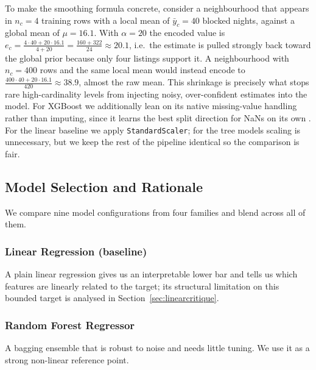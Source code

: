 \documentclass[journal]{IEEEtran}
\begin{document}
To make the smoothing formula concrete, consider a neighbourhood that appears in
$n_c=4$ training rows with a local mean of $\bar y_c=40$ blocked nights, against a
global mean of $\mu=16.1$. With $\alpha=20$ the encoded value is
$e_c=\frac{4\cdot 40+20\cdot 16.1}{4+20}=\frac{160+322}{24}\approx 20.1$, i.e.\
the estimate is pulled strongly back toward the global prior because only four
listings support it. A neighbourhood with $n_c=400$ rows and the same local mean
would instead encode to $\frac{400\cdot40+20\cdot16.1}{420}\approx 38.9$, almost
the raw mean. This shrinkage is precisely what stops rare high-cardinality levels
from injecting noisy, over-confident estimates into the model. For XGBoost we additionally lean on its
native missing-value handling rather than imputing, since it learns the best
split direction for NaNs on its own \cite{chen2016xgboost}. For the linear
baseline we apply \texttt{StandardScaler}; for the tree models scaling is
unnecessary, but we keep the rest of the pipeline identical so the comparison is
fair.

\subsection{Model Selection and Rationale}
We compare nine model configurations from four families and blend across all of
them.

\subsubsection{Linear Regression (baseline)}
A plain linear regression gives us an interpretable lower bar and tells us which
features are linearly related to the target; its structural limitation on this
bounded target is analysed in Section~\ref{sec:linearcritique}.

\subsubsection{Random Forest Regressor}
A bagging ensemble \cite{breiman1996,breiman2001} that is robust to noise and
needs little tuning. We use it as a strong non-linear reference point.
\end{document}
